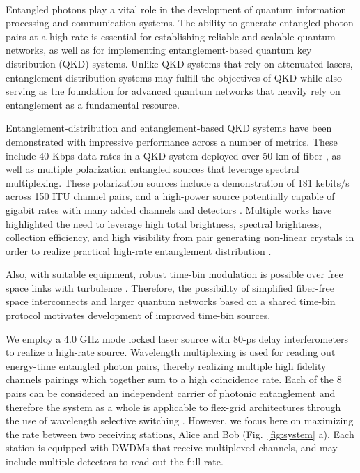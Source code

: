 \documentclass[11pt]{caltech_thesis} %
\begin{document}
~~~~~

Entangled photons play a vital role in the development of quantum
information processing and communication systems. The ability to
generate entangled photon pairs at a high rate is essential for
establishing reliable and scalable quantum networks, as well as for
implementing entanglement-based quantum key distribution (QKD) systems.
Unlike QKD systems that rely on attenuated lasers, entanglement
distribution systems may fulfill the objectives of QKD while also
serving as the foundation for advanced quantum networks that heavily
rely on entanglement as a fundamental resource.

Entanglement-distribution and entanglement-based QKD systems have been
demonstrated with impressive performance across a number of metrics.
These include 40 Kbps data rates in a QKD system deployed over 50 km of
fiber \autocite{Pelet2022}, as well as multiple polarization entangled
sources that leverage spectral multiplexing. These polarization sources
include a demonstration of 181 kebits/s across 150 ITU channel pairs,
and a high-power source potentially capable of gigabit rates with many
added channels and detectors
\autocite{Alshowkan2022,Neumann2022Entanglement}. Multiple works have
highlighted the need to leverage high total brightness, spectral
brightness, collection efficiency, and high visibility from pair
generating non-linear crystals in order to realize practical high-rate
entanglement distribution \autocite{Neumann2022Entanglement}.

Also, with suitable equipment, robust time-bin modulation is possible
over free space links with turbulence \autocite{Jin2019}. Therefore, the
possibility of simplified fiber-free space interconnects and larger
quantum networks based on a shared time-bin protocol motivates
development of improved time-bin sources.

We employ a 4.0 GHz mode locked laser source with 80-ps delay
interferometers to realize a high-rate source. Wavelength multiplexing
is used for reading out energy-time entangled photon pairs, thereby
realizing multiple high fidelity channels pairings which together sum to
a high coincidence rate. Each of the 8 pairs can be considered an
independent carrier of photonic entanglement \autocite{Wengerowsky2018}
and therefore the system as a whole is applicable to flex-grid
architectures through the use of wavelength selective switching
\autocite{Appas2021,Alshowkan22Switching}. However, we focus here on
maximizing the rate between two receiving stations, Alice and Bob
(Fig.~\ref{fig:system} a). Each station is equipped with DWDMs that
receive multiplexed channels, and may include multiple detectors to read
out the full rate.
\end{document}
